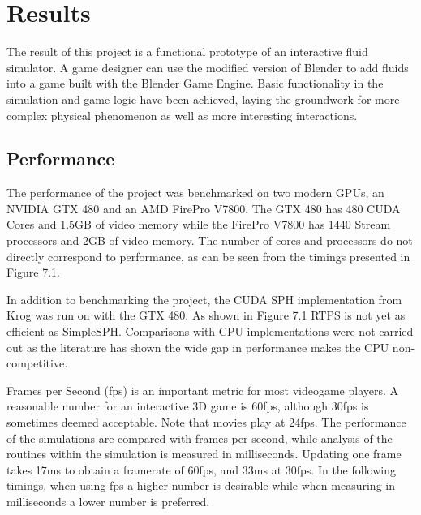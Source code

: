 \chapter{Results}

The result of this project is a functional prototype of an interactive fluid
simulator. A game designer can use the modified version of Blender to add
fluids into a game built with the Blender Game Engine. Basic functionality in
the simulation and game logic have been achieved, laying the groundwork for
more complex physical phenomenon as well as more interesting interactions.


\section{Performance}
    
The performance of the project was benchmarked on two modern GPUs, an NVIDIA
GTX 480 and an AMD FirePro V7800. The GTX 480 has 480 CUDA Cores and 1.5GB of
video memory while the FirePro V7800 has 1440 Stream processors and 2GB of
video memory. The number of cores and processors do not directly correspond to
performance, as can be seen from the timings presented in Figure 7.1.


In addition to benchmarking the project, the CUDA SPH implementation from
Krog\cite{Krog2010} was run on with the GTX 480. As shown in Figure 7.1 RTPS is
not yet as efficient as SimpleSPH. Comparisons with CPU implementations were
not carried out as the literature has shown the wide gap in performance makes
the CPU non-competitive.\cite{Hoetzlein}\cite{Krog2010}

Frames per Second (fps) is an important metric for most videogame players.  A
reasonable number for an interactive 3D game is 60fps, although 30fps is
sometimes deemed acceptable. Note that movies play at 24fps. The performance of
the simulations are compared with frames per second, while analysis of the
routines within the simulation is measured in milliseconds. Updating one frame
takes 17ms to obtain a framerate of 60fps, and 33ms at 30fps. In the following
timings, when using fps a higher number is desirable while when measuring in
milliseconds a lower number is preferred.

\pagebreak
\clearpage

